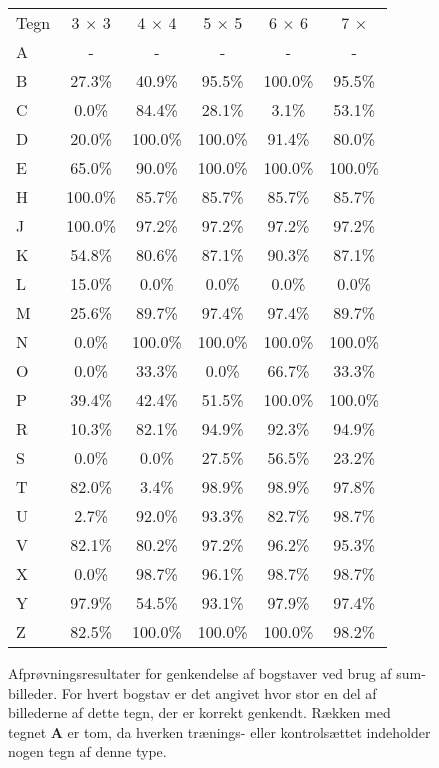 \begin{figure}[htp]
\centering
\begin{tabular}{|l|c|c|c|c|c|}\hline
\rowcolor[gray]{0.9} \multicolumn{6}{|>{\columncolor[gray]{0.9}}c|}{\textbf{Genkendelse af bogstaver - Sum-billeder}} \\ \hline
Tegn & 3 $\times$ 3 & 4 $\times$ 4 & 5 $\times$ 5 & 6 $\times$ 6 & 7 $\times$ \\\hline
A & - & - & - & - & -\\\hline
B & 27.3\% & 40.9\% & 95.5\% & 100.0\% & 95.5\%\\\hline
C & 0.0\% & 84.4\% & 28.1\% & 3.1\% & 53.1\%\\\hline
D & 20.0\% & 100.0\% & 100.0\% & 91.4\% & 80.0\%\\\hline
E & 65.0\% & 90.0\% & 100.0\% & 100.0\% & 100.0\%\\\hline
H & 100.0\% & 85.7\% & 85.7\% & 85.7\% & 85.7\%\\\hline
J & 100.0\% & 97.2\% & 97.2\% & 97.2\% & 97.2\%\\\hline
K & 54.8\% & 80.6\% & 87.1\% & 90.3\% & 87.1\%\\\hline 
L & 15.0\% & 0.0\% & 0.0\% & 0.0\% & 0.0\%\\\hline
M & 25.6\% & 89.7\% & 97.4\% & 97.4\% & 89.7\%\\\hline
N & 0.0\% & 100.0\% & 100.0\% & 100.0\% & 100.0\%\\\hline
O & 0.0\% & 33.3\% & 0.0\% & 66.7\% & 33.3\%\\\hline
P & 39.4\% & 42.4\% & 51.5\% & 100.0\% & 100.0\%\\\hline
R & 10.3\% & 82.1\% & 94.9\% & 92.3\% & 94.9\%\\\hline
S & 0.0\% & 0.0\% & 27.5\% & 56.5\% & 23.2\%\\\hline
T & 82.0\% & 3.4\% & 98.9\% & 98.9\% & 97.8\%\\\hline
U & 2.7\% & 92.0\% & 93.3\% & 82.7\% & 98.7\%\\\hline
V & 82.1\% & 80.2\% & 97.2\% & 96.2\% & 95.3\%\\\hline
X & 0.0\% & 98.7\% & 96.1\% & 98.7\% & 98.7\%\\\hline
Y & 97.9\% & 54.5\% & 93.1\% & 97.9\% & 97.4\%\\\hline
Z & 82.5\% & 100.0\% & 100.0\% & 100.0\% & 98.2\%\\\hline
\end{tabular}
\caption{Afprøvningsresultater for genkendelse af bogstaver ved brug af sum-billeder. For hvert bogstav er det angivet hvor stor en del af billederne af dette tegn, der er korrekt genkendt. Rækken med tegnet \textbf{A} er tom, da hverken trænings- eller kontrolsættet indeholder nogen tegn af denne type.}
\label{fig:test:sum_bogstav}
\end{figure}

